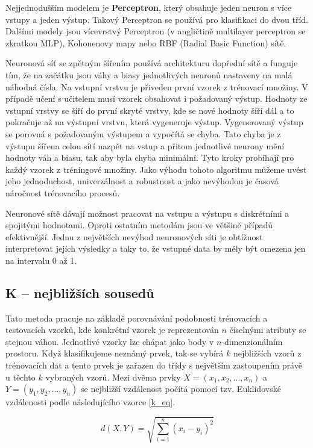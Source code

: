 Nejjednodušším modelem je \textbf{Perceptron}, který obsahuje jeden neuron s více vstupy a jeden výstup. Takový Perceptron se používá pro klasifikaci do dvou tříd. Dalšími modely jsou vícevrstvý Perceptron (v angličtině multilayer perceptron se zkratkou MLP), Kohonenovy mapy nebo RBF (Radial Basic Function) sítě. \cite{Dunham}

Neuronová síť se zpětným šířením používá architekturu dopřední sítě a funguje tím, že na začátku jsou váhy a biasy jednotlivých neuronů nastaveny na malá náhodná čísla. Na vstupní vrstvu je přiveden první vzorek z trénovací množiny. V případě učení s učitelem musí vzorek obsahovat i požadovaný výstup. Hodnoty ze vstupní vrstvy se šíří do první skryté vrstvy, kde se nové hodnoty šíří dál a to pokračuje až na výstupní vrstvu, která vygeneruje výstup. Vygenerovaný výstup se porovná s požadovaným výstupem a vypočítá se chyba. Tato chyba je z výstupu šířena celou sítí nazpět na vstup a přitom jednotlivé neurony mění hodnoty váh a biasu, tak aby byla chyba minimální. Tyto kroky probíhají pro každý vzorek z tréningové množiny. Jako výhodu tohoto algoritmu můžeme uvést jeho jednoduchost, univerzálnost a robustnost a jako nevýhodou je časová náročnost trénovacího procesů. \cite{Han}

Neuronové sítě dávají možnost pracovat na vstupu a výstupu s diskrétními a spojitými hodnotami. Oproti ostatním metodám jsou ve většině případů efektivnější. Jednu z největších nevýhod neuronových síti je obtížnost interpretovat jejích výsledky a taky to, že vstupné data by měly být omezena jen na intervalu 0 až 1. \cite{Kantardzic}

\subsection*{K – nejbližších sousedů}
Tato metoda pracuje na základě porovnávání podobnosti trénovacích a testovacích vzorků, kde konkrétní vzorek je reprezentován $n$ číselnými atributy se stejnou váhou. Jednotlivé vzorky lze chápat jako body v $n$-dimenzionálním prostoru. Když klasifikujeme neznámý prvek, tak se vybírá $k$ nejbližších vzorů z trénovacích dat a tento prvek je zařazen do třídy s největším zastoupením právě u těchto $k$ vybraných vzorů. Mezi dvěma prvky $X = (x_1,x_2,...,x_n)$ a $Y = (y_1,y_2,...,y_n)$ se nejbližší vzdálenost počítá pomocí tzv. Euklidovské vzdálenosti podle následujícího vzorce \ref{k_eq}. \cite{Han}

    \begin{equation}
	    d(X,Y)=\sqrt{\sum_{i=1}^n(x_i-y_i)^2}
	    \label{k_eq}
    \end{equation}


